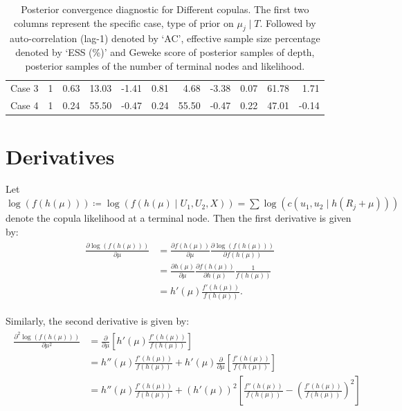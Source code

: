 \documentclass{amsart}
\begin{document}
\begin{table}[ht]
{\begin{tabular}{lc|crr|crr|crr}
			Case 3 & 1 & 0.63 & 13.03 & -1.41 & 0.81 & 4.68 & -3.38 & 0.07 & 61.78 & 1.71 \\ 
			Case 4 & 1 & 0.24 & 55.50 & -0.47 & 0.24 & 55.50 & -0.47 & 0.22 & 47.01 & -0.14 \\ 
			\bottomrule
	\end{tabular}
\caption{Posterior convergence diagnostic for Different copulas. The first two columns represent the specific case, type of prior on $\mu_j\mid T$. Followed by auto-correlation (lag-1) denoted by `AC', effective sample size percentage denoted by `ESS (\%)' and Geweke score of posterior samples of depth, posterior samples of the number of terminal nodes and likelihood.}\label{tab:gauss:convergence}}
\end{table}

\appendix

\section{Derivatives}
Let $\log(f(h(\mu)))\coloneqq \log(f(h(\mu)\mid U_1,U_2,X)) = \sum\log\left(c(u_1,u_2\mid h(R_j+\mu))\right)$ denote the copula likelihood at a terminal node. Then the first derivative is given by:
\begin{align}
	\begin{split}
		\frac{\partial \log(f(h(\mu)))}{\partial \mu} 
		& = \frac{\partial f(h(\mu))}{\partial \mu}\frac{\partial \log(f(h(\mu)))}{\partial f(h(\mu))}\\
		& = \frac{\partial h(\mu)}{\partial \mu}\frac{\partial f(h(\mu))}{\partial h(\mu)}\frac{1}{f(h(\mu))} \\
		& = h'(\mu)\frac{f'(h(\mu))}{f(h(\mu))}.
	\end{split}
\end{align}

Similarly, the second derivative is given by:
\begin{align}
	\begin{split}
		\frac{\partial^2 \log(f(h(\mu)))}{\partial \mu^2}
		& = \frac{\partial}{\partial \mu}\left[h'(\mu)\frac{f'(h(\mu))}{f(h(\mu))}\right]\\
		& = h''(\mu)\frac{f'(h(\mu))}{f(h(\mu))} 
			+ h'(\mu)\frac{\partial}{\partial \mu}\left[\frac{f'(h(\mu))}{f(h(\mu))}\right]\\
		& = h''(\mu)\frac{f'(h(\mu))}{f(h(\mu))} 
		+ \left(h'(\mu)\right)^2\left[\frac{f''(h(\mu))}{f(h(\mu))} - \left(\frac{f'(h(\mu))}{f(h(\mu))}\right)^2\right]
	\end{split}
\end{align}



\end{document}
